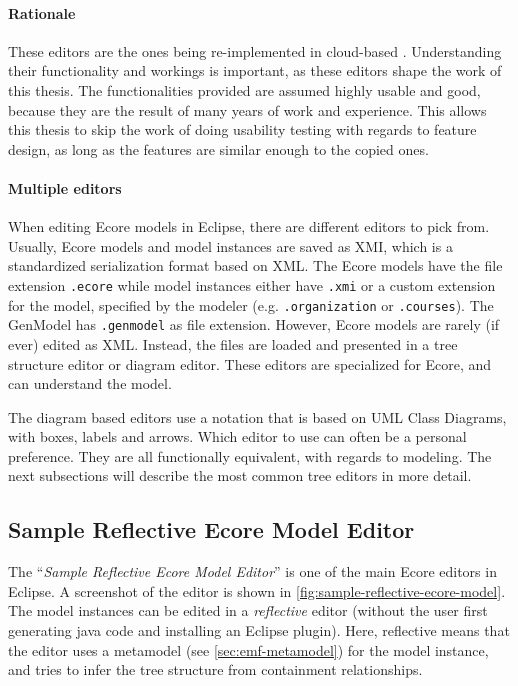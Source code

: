 \paragraph{Rationale}
These editors are the ones being re-implemented in \gls{cloud}-based .
Understanding their functionality and workings is important, as these editors shape the work of this thesis.
The functionalities provided are assumed highly usable and good, because they are the result of many years of work and experience.
This allows this thesis to skip the work of doing usability testing with regards to feature design, as long as the features are similar enough to the copied ones.

\paragraph{Multiple editors}
When editing \gls{Ecore} models in \gls{Eclipse}, there are different editors to pick from.
Usually, \gls{Ecore} models and model instances are saved as \acrfull{XMI}, which is a standardized serialization format based on XML.
The \gls{Ecore} models have the file extension \texttt{.ecore} while model instances either have \texttt{.xmi} or a custom extension for the model, specified by the modeler (e.g. \texttt{.organization} or \texttt{.courses}).
The GenModel has \texttt{.genmodel} as file extension.
However, \gls{Ecore} models are rarely (if ever) edited as XML.
Instead, the files are loaded and presented in a tree structure editor or diagram editor.
These editors are specialized for \gls{Ecore}, and can understand the model.


The diagram based editors use a notation that is based on \gls{UML} Class Diagrams, with boxes, labels and arrows.
Which editor to use can often be a personal preference.
They are all functionally equivalent, with regards to modeling.
The next subsections will describe the most common tree editors in more detail.

\subsection{Sample Reflective Ecore Model Editor}\label{sec:sample-reflective-editor}

The ``\textit{Sample Reflective Ecore Model Editor}'' is one of the main \gls{Ecore} editors in \gls{Eclipse}.
A screenshot of the editor is shown in \cref{fig:sample-reflective-ecore-model}.
The model instances can be edited in a \textit{reflective} editor (without the user first generating java code and installing an \gls{Eclipse} plugin).
Here, reflective means that the editor uses a metamodel (see \cref{sec:emf-metamodel}) for the model instance, and tries to infer the tree structure from containment relationships.


